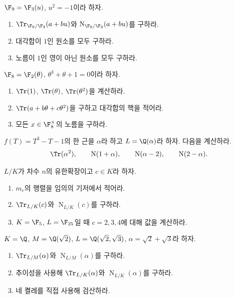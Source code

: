 \begin{exercise}
$\F_9=\F_3(u)$, $u^2=-1$이라 하자.
\begin{enumerate}[label=(\alph*)]
  \item $\Tr_{\F_9/\F_3}(a+bu)$와 $\operatorname N_{\F_9/\F_3}(a+bu)$를 구하라.
  \item 대각합이 $1$인 원소를 모두 구하라.
  \item 노름이 $1$인 영이 아닌 원소를 모두 구하라.
\end{enumerate}
\end{exercise}

\begin{exercise}[*]
\label{ex:finite-field-f8-trace-norm}
$\F_8=\F_2(\theta)$, $\theta^3+\theta+1=0$이라 하자.
\begin{enumerate}[label=(\alph*)]
  \item $\Tr(1)$, $\Tr(\theta)$, $\Tr(\theta^2)$을 계산하라.
  \item $\Tr(a+b\theta+c\theta^2)$을 구하고 대각합의 핵을 적어라.
  \item 모든 $x\in\F_8^\times$의 노름을 구하라.
\end{enumerate}
\end{exercise}

\begin{exercise}
$f(T)=T^3-T-1$의 한 근을 $\alpha$라 하고 $L=\Q(\alpha)$라 하자. 다음을 계산하라.
\[
  \Tr(\alpha^2),
  \qquad
  \operatorname N(1+\alpha),
  \qquad
  \operatorname N(\alpha-2),
  \qquad
  \operatorname N(2-\alpha).
\]
\end{exercise}

\begin{exercise}
$L/K$가 차수 $n$의 유한확장이고 $c\in K$라 하자.
\begin{enumerate}[label=(\alph*)]
  \item $m_c$의 행렬을 임의의 기저에서 적어라.
  \item $\Tr_{L/K}(c)$와 $\operatorname N_{L/K}(c)$를 구하라.
  \item $K=\F_5$, $L=\F_{25}$일 때 $c=2,3,4$에 대해 값을 계산하라.
\end{enumerate}
\end{exercise}

\begin{exercise}[*]
\label{ex:norm-trace-tower-sqrt2-sqrt3}
$K=\Q$, $M=\Q(\sqrt2)$, $L=\Q(\sqrt2,\sqrt3)$, $\alpha=\sqrt2+\sqrt3$라 하자.
\begin{enumerate}[label=(\alph*)]
  \item $\Tr_{L/M}(\alpha)$와 $\operatorname N_{L/M}(\alpha)$를 구하라.
  \item 추이성을 사용해 $\Tr_{L/K}(\alpha)$와 $\operatorname N_{L/K}(\alpha)$를 구하라.
  \item 네 켤레를 직접 사용해 검산하라.
\end{enumerate}
\end{exercise}

